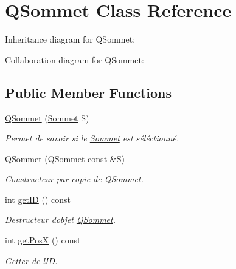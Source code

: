 \hypertarget{classQSommet}{}\section{Q\+Sommet Class Reference}
\label{classQSommet}


Inheritance diagram for Q\+Sommet\+:


Collaboration diagram for Q\+Sommet\+:
\subsection*{Public Member Functions}
\begin{DoxyCompactItemize}
\item 
\hyperlink{classQSommet_a859b1416dbbd9613d4404d623718e921}{Q\+Sommet} (\hyperlink{classSommet}{Sommet} S)
\begin{DoxyCompactList}\small\item\em Permet de savoir si le \hyperlink{classSommet}{Sommet} est s\'{e}l\'{e}ctionn\'{e}. \end{DoxyCompactList}\item 
\hyperlink{classQSommet_ab7db8d44889e696e226e9b5913418915}{Q\+Sommet} (\hyperlink{classQSommet}{Q\+Sommet} const \&S)
\begin{DoxyCompactList}\small\item\em Constructeur par copie de \hyperlink{classQSommet}{Q\+Sommet}. \end{DoxyCompactList}\item 
\mbox{\label{classQSommet_af2da94d1b61aa7296bb50f0a9527e9fa}} 
int \hyperlink{classQSommet_af2da94d1b61aa7296bb50f0a9527e9fa}{get\+ID} () const
\begin{DoxyCompactList}\small\item\em Destructeur d\textquotesingle{}objet \hyperlink{classQSommet}{Q\+Sommet}. \end{DoxyCompactList}\item 
\mbox{\label{classQSommet_ad1218970a980ac6acda3a8d10d7996db}} 
int \hyperlink{classQSommet_ad1218970a980ac6acda3a8d10d7996db}{get\+PosX} () const
\begin{DoxyCompactList}\small\item\em Getter de l\textquotesingle{}ID. \end{DoxyCompactList}\item 
\mbox{\label{classQSommet_a14262ae610196fee768ba5c21d34da6d}} 

\end{DoxyCompactItemize}

